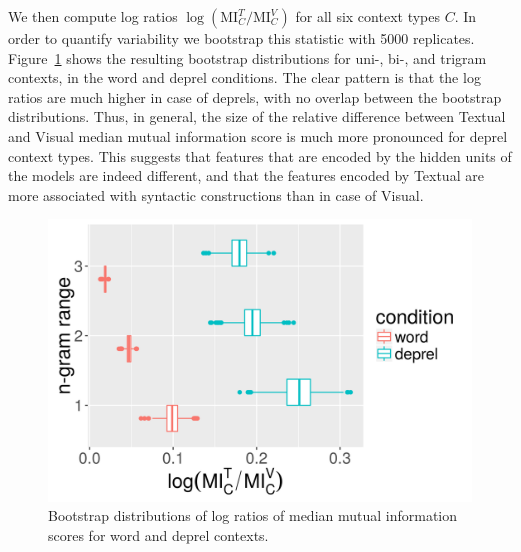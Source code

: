 
We then compute log ratios $\log(\mathrm{MI}^{T}_{C}/\mathrm{MI}^{V}_{C})$ 
for all six context types $C$. In order to quantify variability we bootstrap this statistic with
5000 replicates. Figure~\ref{fig:mi-boot} shows the resulting bootstrap distributions 
for uni-, bi-, and trigram contexts, in the word and deprel conditions. The clear pattern is that the log
ratios are much higher in case of deprels, with no overlap between
the bootstrap distributions. Thus, in general, the size of the
relative difference between {\sc Textual} and {\sc Visual} median
mutual information score is much more pronounced for deprel context types.
This suggests that features that are encoded by the hidden units of
the models are indeed different, and that the features encoded by {\sc
  Textual} are more associated with syntactic constructions than in
case of {\sc Visual}.

\begin{figure}
  \centering
  \includegraphics[scale=0.5]{mi-stat/bootstrappedMI.png}
  \caption{Bootstrap distributions of log ratios of median mutual information scores for word and deprel contexts.}
  \label{fig:mi-boot}
  \vspace{-.2cm}
\end{figure}


